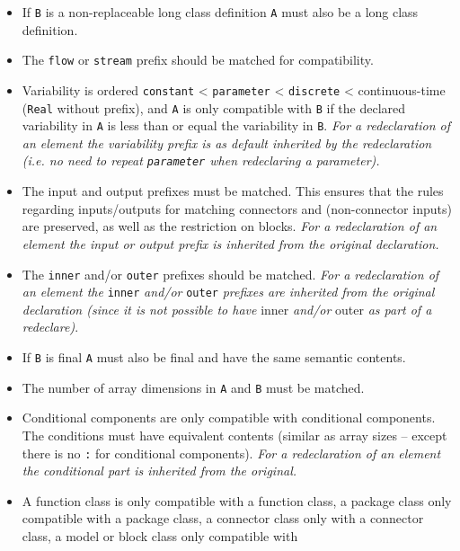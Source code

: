 \begin{itemize}
  \begin{itemize}
  \item
    If \lstinline!B! is a non-replaceable long class definition \lstinline!A! must also be a
    long class definition.
  \item
    The \lstinline!flow! or \lstinline!stream! prefix should be matched for compatibility.
  \item
    Variability is ordered \lstinline!constant! \textless{} \lstinline!parameter! \textless{}
    \lstinline!discrete! \textless{} continuous-time (\lstinline!Real! without prefix), and \lstinline!A! is
    only compatible with \lstinline!B! if the declared variability in \lstinline!A! is less than
    or equal the variability in \lstinline!B!. \emph{For a redeclaration of an
    element the variability prefix is as default inherited by the
    redeclaration (i.e. no need to repeat \lstinline!parameter! when redeclaring a
    parameter).}
  \item
    The input and output prefixes must be matched. This ensures that the
    rules regarding inputs/outputs for matching connectors and
    (non-connector inputs) are preserved, as well as the restriction on
    blocks. \emph{For a redeclaration of an element the input or output
    prefix is inherited from the original declaration.}
  \item
    The \lstinline!inner! and/or \lstinline!outer! prefixes should be matched. \emph{For a
    redeclaration of an element the} \lstinline!inner! \emph{and/or} \lstinline!outer!
    \emph{prefixes are inherited from the original declaration (since it
    is not possible to have} inner \emph{and/or} outer \emph{as part of
    a redeclare)}.
  \item
    If \lstinline!B! is final \lstinline!A! must also be final and have the same semantic
    contents.
  \item
    The number of array dimensions in \lstinline!A! and \lstinline!B! must be matched.
  \item
    Conditional components are only compatible with conditional
    components. The conditions must have equivalent contents (similar as
    array sizes -- except there is no \lstinline!:! for conditional components).
    \emph{For a redeclaration of an element the conditional part is
    inherited from the original.}
  \item
    A function class is only compatible with a function class, a package
    class only compatible with a package class, a connector class only
    with a connector class, a model or block class only compatible with

\end{itemize}
\end{itemize}

